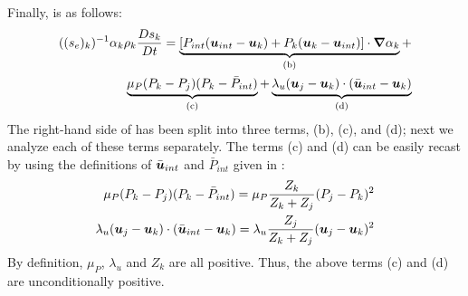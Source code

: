 \begin{appendices}
Finally,  is as follows:
\begin{eqnarray}
\label{eq:ent3}
((s_e)_k)^{-1} \alpha_k \rho_k \frac{Ds_k}{Dt} = \underbrace{\left[ P_{int} (\boldsymbol u_{int}-\boldsymbol u_k) + P_k (\boldsymbol u_k-\boldsymbol u_{int}) \right] \cdot \boldsymbol\nabla \alpha_k}_\textrm{(b)} + \nonumber\\ 
\underbrace{\mu_P (P_k-P_j)(P_k-\bar{P}_{int})}_\textrm{(c)} + \underbrace{\lambda_u(\boldsymbol u_j-\boldsymbol u_k)\cdot(\bar{\boldsymbol u}_{int}-\boldsymbol u_k)}_\textrm{(d)}
\end{eqnarray}
The right-hand side of  has been split into three terms, (b), (c), and (d); next we analyze each of these terms separately. The terms (c) and (d) can be easily recast by using the definitions of $\bar{\boldsymbol u}_{int}$ and $\bar{P}_{int}$ given in :
\begin{eqnarray}
\label{eq:ent4}
\mu_P (P_k-P_j)(P_k-\bar{P}_{int}) = \mu_P \frac{Z_k}{Z_k+Z_j} (P_j - P_k)^2\nonumber\\
\lambda_u(\boldsymbol u_j-\boldsymbol u_k)\cdot(\bar{\boldsymbol u}_{int}-\boldsymbol u_k) = \lambda_u \frac{Z_j}{Z_k+Z_j} (\boldsymbol u_j - \boldsymbol u_k)^2 
\end{eqnarray}
By definition, $\mu_P$, $\lambda_u$ and $Z_k$ are all positive. Thus, the above terms (c) and (d) are unconditionally positive. 


\end{appendices}
